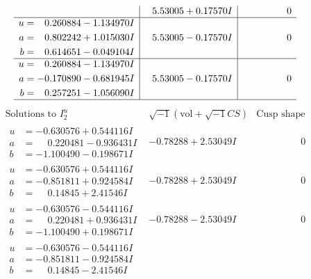 \documentclass[1p]{elsarticle_modified}
\theoremstyle{definition}
\newcommand{\I}{\sqrt{-1}}
\begin{document}
$$\begin{array}{c|c|c}
 & \phantom{-}5.53005 + 0.17570 I & \phantom{-0.000000 } 0 \\ \hline\begin{aligned}
u &= \phantom{-}0.260884 - 1.134970 I \\
a &= \phantom{-}0.802242 + 1.015030 I \\
b &= \phantom{-}0.614651 - 0.049104 I\end{aligned}
 & \phantom{-}5.53005 - 0.17570 I & \phantom{-0.000000 } 0 \\ \hline\begin{aligned}
u &= \phantom{-}0.260884 - 1.134970 I \\
a &= -0.170890 - 0.681945 I \\
b &= \phantom{-}0.257251 - 1.056090 I\end{aligned}
 & \phantom{-}5.53005 - 0.17570 I & \phantom{-0.000000 } 0\\
 \hline 
 \end{array}$$\newpage$$\begin{array}{c|c|c}  
\text{Solutions to }I^u_{2}& \I (\text{vol} + \sqrt{-1}CS) & \text{Cusp shape}\\
 \hline 
\begin{aligned}
u &= -0.630576 + 0.544116 I \\
a &= \phantom{-}0.220481 - 0.936431 I \\
b &= -1.100490 - 0.198671 I\end{aligned}
 & -0.78288 + 2.53049 I & \phantom{-0.000000 } 0 \\ \hline\begin{aligned}
u &= -0.630576 + 0.544116 I \\
a &= -0.851811 + 0.924584 I \\
b &= \phantom{-}0.14845 + 2.41546 I\end{aligned}
 & -0.78288 + 2.53049 I & \phantom{-0.000000 } 0 \\ \hline\begin{aligned}
u &= -0.630576 - 0.544116 I \\
a &= \phantom{-}0.220481 + 0.936431 I \\
b &= -1.100490 + 0.198671 I\end{aligned}
 & -0.78288 - 2.53049 I & \phantom{-0.000000 } 0 \\ \hline\begin{aligned}
u &= -0.630576 - 0.544116 I \\
a &= -0.851811 - 0.924584 I \\
b &= \phantom{-}0.14845 - 2.41546 I\end{aligned}

\end{array}$$
\end{document}
